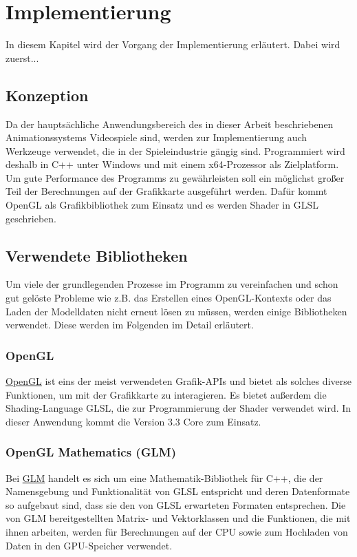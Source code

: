 \chapter{Implementierung}
In diesem Kapitel wird der Vorgang der Implementierung erläutert. Dabei wird zuerst...


\section{Konzeption}
Da der hauptsächliche Anwendungsbereich des in dieser Arbeit beschriebenen Animationssystems Videospiele sind, werden zur Implementierung auch Werkzeuge verwendet, die in der Spieleindustrie gängig sind. Programmiert wird deshalb in C++ unter Windows und mit einem x64-Prozessor als Zielplatform. Um gute Performance des Programms zu gewährleisten soll ein möglichst großer Teil der Berechnungen auf der Grafikkarte ausgeführt werden. Dafür kommt OpenGL als Grafikbibliothek zum Einsatz und es werden Shader in GLSL geschrieben.


\section{Verwendete Bibliotheken}
Um viele der grundlegenden Prozesse im Programm zu vereinfachen und schon gut gelöste Probleme wie z.B. das Erstellen eines OpenGL-Kontexts oder das Laden der Modelldaten nicht erneut lösen zu müssen, werden einige Bibliotheken verwendet. Diese werden im Folgenden im Detail erläutert.

\subsection{OpenGL}
\href{https://www.opengl.org/}{OpenGL} ist eins der meist verwendeten Grafik-APIs und bietet als solches diverse Funktionen, um mit der Grafikkarte zu interagieren. Es bietet außerdem die Shading-Language GLSL, die zur Programmierung der Shader verwendet wird. In dieser Anwendung kommt die Version 3.3 Core zum Einsatz.

\subsection{OpenGL Mathematics (GLM)}
Bei \href{https://glm.g-truc.net/0.9.9/index.html}{GLM} handelt es sich um eine Mathematik-Bibliothek für C++, die der Namensgebung und Funktionalität von GLSL entspricht und deren Datenformate so aufgebaut sind, dass sie den von GLSL erwarteten Formaten entsprechen. Die von GLM bereitgestellten Matrix- und Vektorklassen und die Funktionen, die mit ihnen arbeiten, werden für Berechnungen auf der CPU sowie zum Hochladen von Daten in den GPU-Speicher verwendet.

